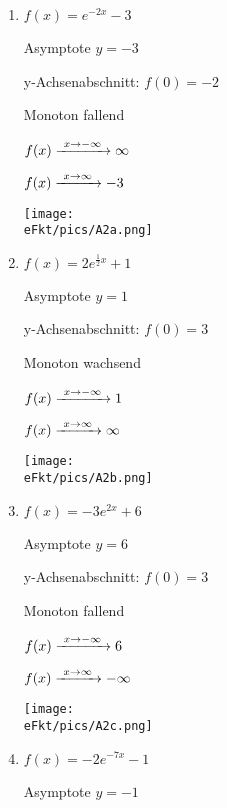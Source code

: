 \newpage
\begin{Answer}[ref=eFktA2]

	\begin{minipage}{\textwidth}
		\begin{minipage}{0.5\textwidth}
			\begin{enumerate}[label=\alph*)]
				\item \(f(x)=e^{-2x}-3\)

				Asymptote \(y=-3\)

				y-Achsenabschnitt: \(f(0)=-2\)

				Monoton fallend

				\(f(x)\xrightarrow{\hphantom{\ }x\to-\infty\hphantom{\ }}\infty\)

				\(f(x)\xrightarrow{\hphantom{\ }x\to\infty\hphantom{\ }}-3\)

				\texttt{[image: \\eFkt/pics/A2a.png]}
				\item \(f(x)=2e^{\frac{1}{2}x}+1\)

				Asymptote \(y=1\)

				y-Achsenabschnitt: \(f(0)=3\)

				Monoton wachsend

				\(f(x)\xrightarrow{\hphantom{\ }x\to-\infty\hphantom{\ }}1\)

				\(f(x)\xrightarrow{\hphantom{\ }x\to\infty\hphantom{\ }}\infty\)

				\texttt{[image: \\eFkt/pics/A2b.png]}
			\end{enumerate}
		\end{minipage}%
		\begin{minipage}{0.5\textwidth}
			\begin{enumerate}[label=\alph*)]
				\setcounter{enumi}{2}
				\item \(f(x)=-3e^{2x}+6\)

				Asymptote \(y=6\)

				y-Achsenabschnitt: \(f(0)=3\)

				Monoton fallend

				\(f(x)\xrightarrow{\hphantom{\ }x\to-\infty\hphantom{\ }}6\)

				\(f(x)\xrightarrow{\hphantom{\ }x\to\infty\hphantom{\ }}-\infty\)

				\texttt{[image: \\eFkt/pics/A2c.png]}
				\item \(f(x)=-2e^{-7x}-1\)

				Asymptote \(y=-1\)


\end{enumerate}
\end{minipage}
\end{minipage}
\end{Answer}
